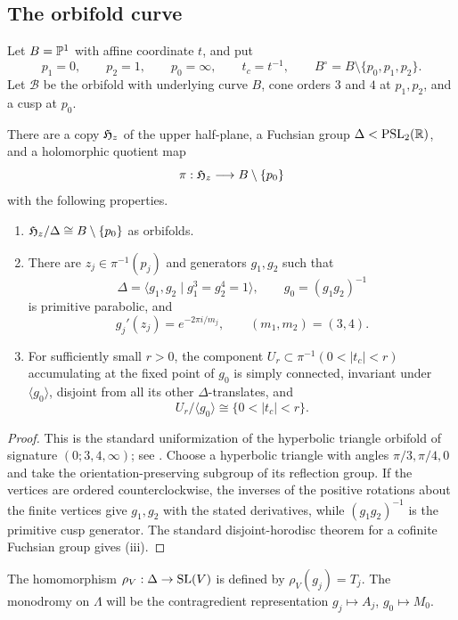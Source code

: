 \subsection{The orbifold curve}
Let $B=\mathbb P^1$ with affine coordinate $t$, and put
\[
 p_1=0,
 \qquad p_2=1,
 \qquad p_0=\infty,
 \qquad t_c=t^{-1},
 \qquad B^\circ=B\setminus\{p_0,p_1,p_2\}.
\]
Let $\mathcal B$ be the orbifold with underlying curve $B$, cone orders
$3$ and $4$ at $p_1,p_2$, and a cusp at $p_0$.

\begin{proposition}[Uniformization]\label{prop:uniformization}
There are a copy $\mathfrak H_z$ of the upper half-plane, a Fuchsian group
$\Delta<\mathrm{PSL}_2(\mathbb R)$, and a holomorphic quotient map
\[
 \pi:\mathfrak H_z\longrightarrow B\setminus\{p_0\}
\]
with the following properties.
\begin{enumerate}[label=\textup{(\roman*)}]
\item $\mathfrak H_z/\Delta\cong B\setminus\{p_0\}$ as orbifolds.
\item There are $z_j\in\pi^{-1}(p_j)$ and generators $g_1,g_2$ such that
\[
 \Delta=\langle g_1,g_2\mid g_1^3=g_2^4=1\rangle,
 \qquad g_0=(g_1g_2)^{-1}
\]
is primitive parabolic, and
\[
 g_j'(z_j)=e^{-2\pi i/m_j},
 \qquad (m_1,m_2)=(3,4).
\]
\item For sufficiently small $r>0$, the component
$U_r\subset\pi^{-1}(0<|t_c|<r)$ accumulating at the fixed point of
$g_0$ is simply connected, invariant under $\langle g_0\rangle$, disjoint
from all its other $\Delta$-translates, and
\[
 U_r/\langle g_0\rangle\cong\{0<|t_c|<r\}.
\]
\end{enumerate}
\end{proposition}

\begin{proof}
This is the standard uniformization of the hyperbolic triangle orbifold of
signature $(0;3,4,\infty)$; see \cite[Chs.~7,10]{Beardon}.  Choose a hyperbolic triangle with angles
$\pi/3,\pi/4,0$ and take the orientation-preserving subgroup of its
reflection group.  If the vertices are ordered counterclockwise, the
inverses of the positive rotations about the finite vertices give
$g_1,g_2$ with the stated derivatives, while $(g_1g_2)^{-1}$ is the
primitive cusp generator.  The standard disjoint-horodisc theorem for a
cofinite Fuchsian group gives (iii).
\end{proof}

The homomorphism $\rho_V:\Delta\to\operatorname{SL}(V)$ is defined by
$\rho_V(g_j)=T_j$.  The monodromy on $\Lambda$ will be the contragredient
representation $g_j\mapsto A_j$, $g_0\mapsto M_0$.

